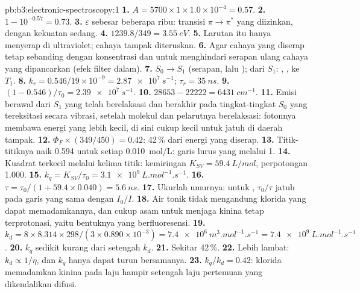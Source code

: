 \begin{solution}{pb:b3:electronic-spectroscopy:1}
\textbf{1.} $A = 5700 \times 1 \times 1.0\times10^{-4} = 0.57$.
\textbf{2.} $1 - 10^{-0.57} = 0.73$.
\textbf{3.} $\varepsilon$ sebesar beberapa ribu: transisi $\pi\to\pi^*$ yang
diizinkan, dengan kekuatan sedang.
\textbf{4.} $1239.8/349 = \qty{3.55}{eV}$.
\textbf{5.} Larutan itu hanya menyerap di ultraviolet; cahaya tampak diteruskan.
\textbf{6.} Agar cahaya yang diserap tetap sebanding dengan konsentrasi dan
untuk menghindari serapan ulang cahaya yang dipancarkan (efek filter dalam).
\textbf{7.} $S_0 \to S_1$ (serapan, lalu ); dari $S_1$:
, ,  ke $T_1$.
\textbf{8.} $k_r = 0.546/19 \times 10^{-9} = \qty{2.87e7}{s^{-1}}$; $\tau_r = \qty{35}{ns}$.
\textbf{9.} $(1 - 0.546)/\tau_0 = \qty{2.39e7}{s^{-1}}$.
\textbf{10.} $28653 - 22222 = \qty{6431}{cm^{-1}}$.
\textbf{11.} Emisi berawal dari $S_1$ yang telah berelaksasi dan berakhir pada
tingkat-tingkat $S_0$ yang tereksitasi secara vibrasi, setelah molekul dan
pelarutnya berelaksasi: fotonnya membawa energi yang lebih kecil, di sini
cukup kecil untuk jatuh di daerah tampak.
\textbf{12.} $\Phi_F \times (349/450) = 0.42$: 42\,\% dari energi yang diserap.
\textbf{13.} Titik-titiknya naik 0.594 untuk setiap \qty{0.010}{mol/L}: garis
lurus yang melalui 1.
\textbf{14.} Kuadrat terkecil melalui kelima titik: kemiringan
$K_{SV} = \qty{59.4}{L/mol}$, perpotongan 1.000.
\textbf{15.} $k_q = K_{SV}/\tau_0 = \qty{3.1e9}{L.mol^{-1}.s^{-1}}$.
\textbf{16.} $\tau = \tau_0/(1 + 59.4 \times 0.040) = \qty{5.6}{ns}$.
\textbf{17.} Ukurlah umurnya: untuk , $\tau_0/\tau$ jatuh pada
garis yang sama dengan $I_0/I$.
\textbf{18.} Air tonik tidak mengandung klorida yang dapat memadamkannya, dan
cukup asam untuk menjaga kinina tetap terprotonasi, yaitu bentuknya yang
berfluoresensi.
\textbf{19.} $k_d = 8 \times 8.314 \times 298/(3 \times 0.890\times10^{-3}) =
\qty{7.4e6}{m^3.mol^{-1}.s^{-1}} = \qty{7.4e9}{L.mol^{-1}.s^{-1}}$.
\textbf{20.} $k_q$ sedikit kurang dari setengah $k_d$.
\textbf{21.} Sekitar 42\,\%.
\textbf{22.} Lebih lambat: $k_d \propto 1/\eta$, dan $k_q$ hanya dapat turun
bersamanya.
\textbf{23.} \textbf{$k_q/k_d = 0.42$}: klorida memadamkan kinina pada laju
hampir setengah laju pertemuan yang dikendalikan difusi.
\end{solution}
